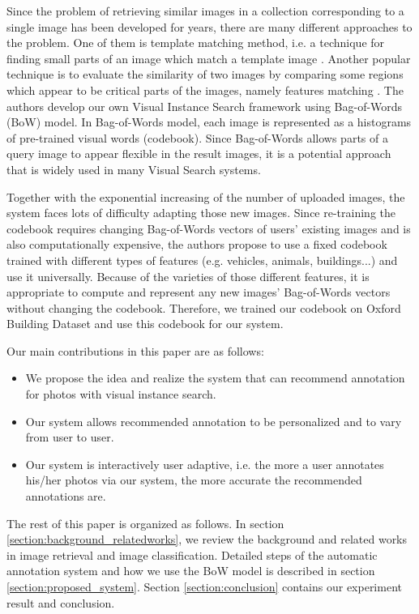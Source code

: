 Since the problem of retrieving similar images in a collection corresponding to a single image has been developed for years, there are many different approaches to the problem. One of them is template matching method, i.e. a technique for finding small parts of an image which match a template image \cite{brunelli_template_matching,Rosenfeld4309663,Gharavi913587}. Another popular technique is to evaluate the similarity of two images by comparing some regions which appear to be critical parts of the images, namely features matching \cite{Belongie710790,Rubner,Viola990517}. The authors develop our own Visual Instance Search framework using Bag-of-Words (BoW) model. In Bag-of-Words model, each image is represented as a histograms of pre-trained visual words (codebook). Since Bag-of-Words allows parts of a query image to appear flexible in the result images, it is a potential approach that is widely used in many Visual Search systems. 

Together with the exponential increasing of the number of uploaded images, the system faces lots of difficulty adapting those new images. Since re-training the codebook requires changing Bag-of-Words vectors of users' existing images and is also computationally expensive, the authors propose to use a fixed codebook trained with different types of features (e.g. vehicles, animals, buildings...) and use it universally. Because of the varieties of those different features, it is appropriate to compute and represent any new images' Bag-of-Words vectors without changing the codebook. Therefore, we trained our codebook on Oxford Building Dataset and use this codebook for our system.

Our main contributions in this paper are as follows:
\begin{itemize}
	\item We propose the idea and realize the system that can recommend annotation for photos with visual instance search.
	\item Our system allows recommended annotation to be personalized and to vary from user to user.
	\item Our system is interactively user adaptive, i.e. the more a user annotates his/her photos via our system, the more accurate the recommended annotations are.
\end{itemize}

The rest of this paper is organized as follows. In section \ref{section:background_relatedworks}, we review the background and related works in image retrieval and image classification. Detailed steps of the automatic annotation system and how we use the BoW model is described in section \ref{section:proposed_system}. Section \ref{section:conclusion} contains our experiment result and conclusion.

